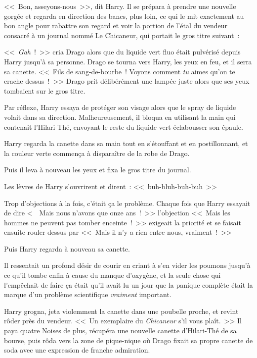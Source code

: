 <<~Bon, asseyons-nous~>>, dit Harry. Il se prépara à prendre une nouvelle gorgée et regarda en direction des bancs, plus loin, ce qui le mit exactement au bon angle pour rabattre son regard et voir la portion de l'étal du vendeur consacré à un journal nommé Le Chicaneur, qui portait le gros titre suivant~:


<<~\emph{Gah}~!~>> cria Drago alors que du liquide vert fluo était pulvérisé depuis Harry jusqu'à sa personne. Drago se tourna vers Harry, les yeux en feu, et il serra sa canette. <<~Fils de sang-de-bourbe~! Voyons comment \emph{tu} aimes qu'on te crache dessus~!~>> Drago prit délibérément une lampée juste alors que ses yeux tombaient sur le gros titre.

Par réflexe, Harry essaya de protéger son visage alors que le spray de liquide volait dans sa direction. Malheureusement, il bloqua en utilisant la main qui contenait l'Hilari-Thé, envoyant le reste du liquide vert éclabousser son épaule.

Harry regarda la canette dans sa main tout en s'étouffant et en postillonnant, et la couleur verte commença à disparaître de la robe de Drago.

Puis il leva à nouveau les yeux et fixa le gros titre du journal.


Les lèvres de Harry s'ouvrirent et dirent~: <<~buh-bluh-buh-buh~>>

Trop d'objections à la fois, c'était ça le problème. Chaque fois que Harry essayait de dire <~~Mais nous n'avons que onze ans~!~>> l'objection <<~Mais les hommes ne peuvent pas tomber enceinte~!~>> exigeait la priorité et se faisait ensuite rouler dessus par <<~Mais il n'y a rien entre nous, vraiment~!~>>

Puis Harry regarda à nouveau sa canette.

Il ressentait un profond désir de courir en criant à s'en vider les poumons jusqu'à ce qu'il tombe enfin à cause du manque d'oxygène, et la seule chose qui l'empêchait de faire ça était qu'il avait lu un jour que la panique complète était la marque d'un problème scientifique \emph{vraiment} important.

Harry grogna, jeta violemment la canette dans une poubelle proche, et revint rôder près du vendeur. <<~Un exemplaire du \emph{Chicaneur} s'il vous plaît.~>> Il paya quatre Noises de plus, récupéra une nouvelle canette d'Hilari-Thé de sa bourse, puis rôda vers la zone de pique-nique où Drago fixait sa propre canette de soda avec une expression de franche admiration.

